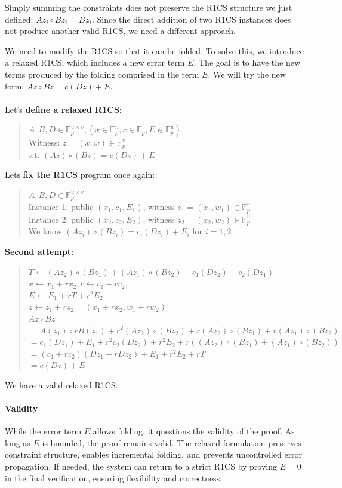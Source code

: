 Simply summing the constraints does not preserve the R1CS structure we just defined: $Az_i \circ Bz_i = Dz_i$.
Since the direct addition of two R1CS instances does not produce another valid R1CS, we need a different approach.

We need to modify the R1CS so that it can be folded.
To solve this, we introduce a relaxed R1CS, which includes a new error term $E$.
The goal is to have the new terms produced by the folding comprised in the term $E$.
We will try the new form: $Az \circ Bz = c(Dz) + E$.
\\
\\
Let's \textbf{define a relaxed R1CS}:
\begin{quote}
$A, B,D \in \mathbb{F}^{u \times v}_p, (x \in \mathbb{F}^n_p, c \in \mathbb{F}_p, E \in \mathbb{F}^u_p) $
\\
Witness: $ z = (x,w) \in \mathbb{F}^v_p$ 
\\
s.t. $(Az) \circ (Bz) = c(Dz) + E$
\end{quote}
Lets \textbf{fix the R1CS} program once again:
\begin{quote}
$A,B,D \in \mathbb{F}^{u \times v}_p $
\\
Instance 1: public $ (x_1,c_1,E_1)$, witness $z_1 = (x_1, w_1) \in \mathbb{F}^v_p$
\\
Instance 2: public $(x_2,c_2,E_2)$, witness $ z_2 = (x_2, w_2) \in \mathbb{F}^v_p$
\\
We know $(Az_i) \circ (Bz_i) = c_i(Dz_i) + E_i$ for $ i = 1,2$
\end{quote}


\textbf{Second attempt}:
\begin{quote}
$T \leftarrow (Az_2) \circ (Bz_1) + (Az_1) \circ (Bz_2) - c_1(Dz_2) - c_2(Dz_1)$
\\
$x \leftarrow x_1 + rx_2, c \leftarrow c_1 + rc_2,$
\\
$E \leftarrow E_1 + rT +r^2E_2$
\\
$z \leftarrow z_1 + rz_2 = (x_1 +rx_2, w_1 + rw_2)$
\\
$Az \circ Bz = $
\\
$=A(z_1) \circ rB(z_1) +r^2(Az_2) \circ (Bz_2) + r(Az_2) \circ (Bz_1) + r(Az_1) \circ (Bz_2)$
\\
$=c_1(Dz_1) + E_1 + r^2c_2(Dz_2) + r^2E_2+r((Az_2) \circ (Bz_1) + (Az_1) \circ (Bz_2))$
\\
$=(c_1+rc_2)(Dz_1+rDz_2)+E_1+r^2E_2+rT$
\\
$=c(Dz) + E$
\end{quote}
We have a valid relaxed R1CS.

\paragraph{Validity}
While the error term $E$ allows folding, it questions the validity of the proof. As long as $E$ is bounded, the proof remains valid. \cite{Nova23}
The relaxed formulation preserves constraint structure, enables incremental folding, and prevents uncontrolled error propagation. 
If needed, the system can return to a strict R1CS by proving $E = 0$ in the final verification, ensuring flexibility and correctness.
